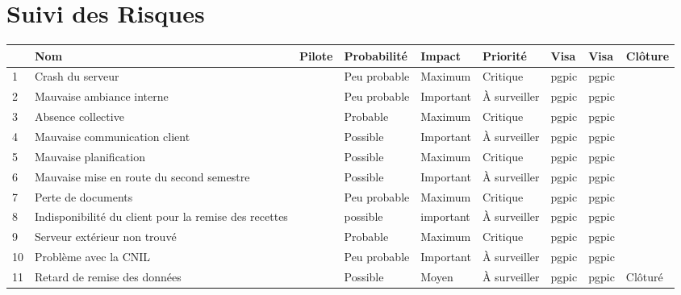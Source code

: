 \documentclass[asi]{picInsa}
\begin{document}
\chapter*{Suivi des Risques}
\begin{longtable}{|p{0.3cm}|p{2.5cm}|p{2cm}|p{2cm}|p{1.8cm}|p{1.5cm}|p{1cm}|p{1cm}|p{1.5cm}|}
			\hline
			\rowcolor{gray!40}
			\No & Nom & Pilote & Probabilité & Impact & Priorité & Visa \RQCourt{} & Visa \CPCourt{} & Clôture \\\hline
			
			 1 & Crash du serveur & \Matthieu & Peu probable & Maximum & Critique & pgpic & pgpic & \\\hline
			 
			 2 & Mauvaise ambiance interne & \Michel & Peu probable & Important & À surveiller & pgpic & pgpic & \\\hline
			 
			 3 & Absence collective & \Pierre & Probable & Maximum & Critique & pgpic & pgpic & \\\hline
			 
			 4 & Mauvaise communication client & \Julie & Possible & Important & À surveiller & pgpic & pgpic & \\\hline
			 
			 5 & Mauvaise planification & \Florian & Possible & Maximum & Critique & pgpic & pgpic & \\\hline
			 
			 6 & Mauvaise mise en route du second semestre & \Melissa & Possible & Important & À surveiller & pgpic & pgpic & \\\hline
			 
			 7 & Perte de documents & \Mathieu & Peu probable & Maximum & Critique & pgpic & pgpic & \\\hline
			 
			 8 & Indisponibilité du client pour la remise des recettes & \Julie & possible & important & À surveiller & pgpic & pgpic & \\\hline
			 
			 9 & Serveur extérieur non trouvé & \Matthieu & Probable & Maximum & Critique & pgpic & pgpic & \\\hline
			 
			 10 & Problème avec la CNIL & \Pierre & Peu probable & Important & À surveiller & pgpic & pgpic & \\\hline
			 
			 11 & Retard de remise des données & \Sergi & Possible & Moyen & À surveiller & pgpic & pgpic & Clôturé \\\hline
			 

\end{longtable}
\end{document}
